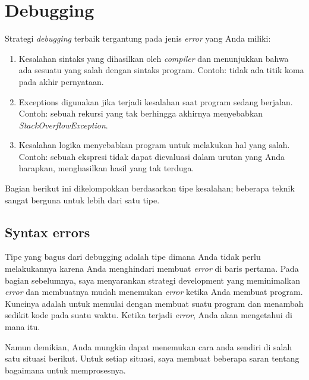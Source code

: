 \documentclass[12pt,b5paper,openright,twoside]{book}
\begin{document}
\chapter{Debugging}

Strategi \textit{debugging} terbaik tergantung pada jenis \textit{error} yang Anda miliki:
\begin{enumerate}
    \item Kesalahan sintaks yang dihasilkan oleh \textit{compiler} dan menunjukkan bahwa ada sesuatu yang salah dengan sintaks program. Contoh: tidak ada titik koma pada akhir pernyataan.
    \item Exceptions digunakan jika terjadi kesalahan saat program sedang berjalan. Contoh: sebuah rekursi yang tak berhingga akhirnya menyebabkan \textit{StackOverflowException}.
    \item Kesalahan logika menyebabkan program untuk melakukan hal yang salah. Contoh: sebuah ekspresi tidak dapat dievaluasi dalam urutan yang Anda harapkan, menghasilkan hasil yang tak terduga.
\end{enumerate}

Bagian berikut ini dikelompokkan berdasarkan tipe kesalahan; beberapa teknik sangat berguna untuk lebih dari satu tipe.

\section{Syntax errors}
Tipe yang bagus dari debugging adalah tipe dimana Anda tidak perlu melakukannya karena Anda menghindari membuat \textit{error} di baris pertama. Pada bagian sebelumnya, saya menyarankan strategi development yang meminimalkan \textit{error} dan membuatnya mudah menemukan \textit{error} ketika Anda membuat program. Kuncinya adalah untuk memulai dengan membuat suatu program dan menambah sedikit kode pada suatu waktu. Ketika terjadi \textit{error}, Anda akan mengetahui di mana itu. \par 

\noindent Namun demikian, Anda mungkin dapat menemukan cara anda sendiri di salah satu situasi berikut. Untuk setiap situasi, saya membuat beberapa saran tentang bagaimana untuk memprosesnya.
\end{document}
